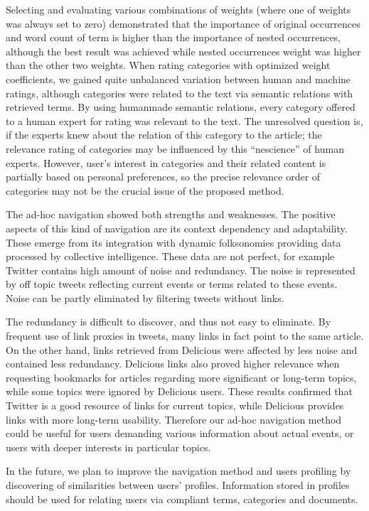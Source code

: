 \documentclass{llncs}%
\begin{document}
Selecting and evaluating various combinations of weights (where one of weights was always set to zero) demonstrated that the importance of original occurrences and word count of term is higher than the importance of nested occurrences, although the best result was achieved while nested occurrences weight was higher than the other two weights. When rating categories with optimized weight coefficients, we gained quite unbalanced variation between human and machine ratings, although categories were related to the text via semantic relations with retrieved terms. By using humanmade semantic relations, every category offered to a human expert for rating was relevant to the text. The unresolved question is, if the experts knew about the relation of this category to the article; the relevance rating of categories may be influenced by this “nescience” of human experts. However, user's interest in categories and their related content is partially based on personal preferences, so the precise relevance order of categories may not be the crucial issue of the proposed method. 

The ad-hoc navigation showed both strengths and weaknesses. The positive aspects of this kind of navigation are its context dependency and adaptability. These emerge from its integration with dynamic folksonomies providing data processed by collective intelligence. These data are not perfect, for example Twitter contains high amount of noise and redundancy. The noise is represented by off topic tweets reflecting current events or terms related to these events. Noise can be partly eliminated by filtering tweets without links.  

The redundancy is difficult to discover, and thus not easy to eliminate. By frequent use of link proxies in tweets, many links in fact point to the same article. On the other hand, links retrieved from Delicious were affected by less noise and contained less redundancy. Delicious links also proved higher relevance when requesting bookmarks for articles regarding more significant or long-term topics, while some topics were ignored by Delicious users. These results confirmed that Twitter is a good resource of links for current topics, while Delicious provides links with more long-term usability. Therefore our ad-hoc navigation method could be useful for users demanding various information about actual events, or users with deeper interests in particular topics. 

In the future, we plan to improve the navigation method and users profiling by discovering of similarities between users' profiles. Information stored in profiles should be used for relating users via compliant terms, categories and documents. 
\end{document}

